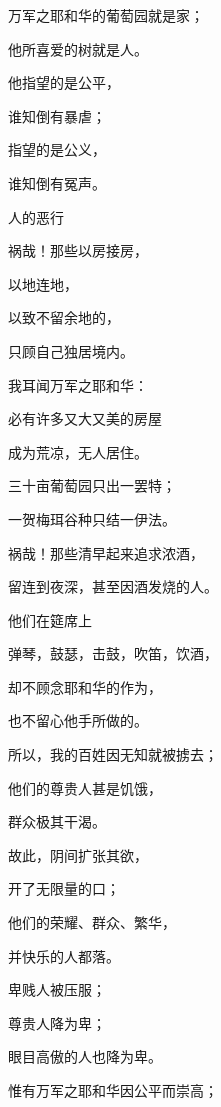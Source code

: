 {\par }{\BB \par }{\Q {}万军之耶和华的葡萄园就是{}家；
\par }{\Q 他所喜爱的树就是{}人。
\par }{\Q 他指望的是公平，
\par }{\Q 谁知倒有暴虐；
\par }{\Q 指望的是公义，
\par }{\Q 谁知倒有冤声。
\par }{\SH 人的恶行
\par }{\Q {}祸哉！那些以房接房，
\par }{\Q 以地连地，
\par }{\Q 以致不留余地的，
\par }{\Q 只顾自己独居境内。
\par }{\Q {}我耳闻万军之耶和华{}：
\par }{\Q 必有许多又大又美的房屋
\par }{\Q 成为荒凉，无人居住。
\par }{\Q {}三十亩葡萄园只出一罢特{}；
\par }{\Q 一贺梅珥谷种只结一伊法{}。
\par }{\BB \par }{\Q {}祸哉！那些清早起来追求浓酒，
\par }{\Q 留连到夜深，甚至因酒发烧的人。
\par }{\Q {}他们在筵席上
\par }{\Q 弹琴，鼓瑟，击鼓，吹笛，饮酒，
\par }{\Q 却不顾念耶和华的作为，
\par }{\Q 也不留心他手所做的。
\par }{\BB \par }{\Q {}所以，我的百姓因无知就被掳去；
\par }{\Q 他们的尊贵人甚是饥饿，
\par }{\Q 群众极其干渴。
\par }{\Q {}故此，阴间扩张其欲，
\par }{\Q 开了无限量的口；
\par }{\Q 他们的荣耀、群众、繁华，
\par }{\Q 并快乐的人都落{}。
\par }{\Q {}卑贱人被压服；
\par }{\Q 尊贵人降为卑；
\par }{\Q 眼目高傲的人也降为卑。
\par }{\Q {}惟有万军之耶和华因公平而崇高；
}
